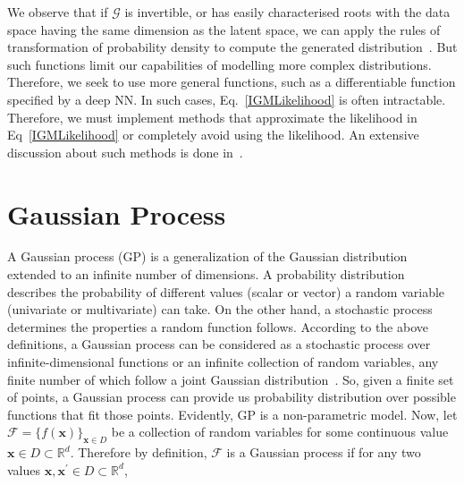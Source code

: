 We observe that if $\mathcal{G}$ is invertible, or has easily characterised roots with the data space having the same dimension as the latent space, we can apply the rules of transformation of probability density to compute the generated distribution~\cite{LearnIGM}. But such functions limit our capabilities of modelling more complex distributions. Therefore, we seek to use more general functions, such as a differentiable function specified by a deep NN. In such cases, Eq.~\ref{IGMLikelihood} is often intractable. Therefore, we must implement methods that approximate the likelihood in Eq~\ref{IGMLikelihood} or completely avoid using the likelihood. An extensive discussion about such methods is done in~\cite{LearnIGM}.


    

\section{Gaussian Process}\label{GP}
A Gaussian process (GP) is a generalization of the Gaussian distribution extended to an infinite number of dimensions. A probability distribution describes the probability of different values (scalar or vector) a random variable (univariate or multivariate) can take. On the other hand, a stochastic process determines the properties a random function follows. According to the above definitions, a Gaussian process can be considered as a stochastic process over infinite-dimensional functions or an infinite collection of random variables, any finite number of which follow a joint Gaussian distribution~\cite{GPML}. So, given a finite set of points, a Gaussian process can provide us probability distribution over possible functions that fit those points. Evidently, GP is a non-parametric model. Now, let $\mathcal{F}=\{f(\mathbf{x})\}_{\mathbf{x} \in D}$ be a collection of random variables for some continuous value $\mathbf{x} \in D \subset \mathbb{R}^d$. Therefore by definition, $\mathcal{F}$ is a Gaussian process if for any two values $\mathbf{x}, \mathbf{x}^{\prime} \in D \subset \mathbb{R}^d$,

